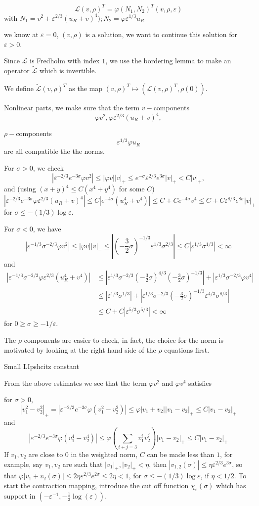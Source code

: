 \documentclass[letterpaper,11pt]{article}
\newcommand{\eps}{\varepsilon}
\numberwithin{equation}{section}
\theoremstyle{plain}
\begin{document}
\[
\mathcal{L}(v,\rho)^T = \varphi(N_1,N_2)^T(v,\rho,\eps)
\]
with $N_1 = v^2+\eps^{2/3}(u_R+v)^4); N_2 = \varphi\eps^{1/3}u_R$

we know at $\eps = 0$, $(v,\rho)$ is a solution, we want to continue this solution for $\eps>0$.

Since $\mathcal{L}$ is Fredholm with index $1$, we use the bordering lemma to make an operator $\tilde{\mathcal{L}}$ which is invertible.

We define $\tilde{\mathcal{L}}(v,\rho)^T$ as the map $(v,\rho)^T \mapsto (\mathcal{L}(v,\rho)^T,\rho(0))$.

Nonlinear parts, we make sure that 
the term 
$v-$components
\[
\varphi v^2, \varphi \eps^{2/3}(u_R+v)^4, 
\]

$\rho-$components
\[
\eps^{1/3}\varphi u_R
\]
are all compatible the the norms.

For $\sigma > 0$, we check
\[
|\eps^{-2/3}e^{-3\sigma} \varphi v^2|  \le | \varphi v||v|_+ \le e^{-\sigma} \eps^{2/3}e^{3\sigma} |v|_+ < C|v|_+ , 
\]
and (using $(x+y)^4 \le C(x^4+y^4)$ for some $C$)
\[
|\eps^{-2/3}e^{-3\sigma} \varphi \eps^{2/3}(u_R+v)^4| \le  C |e^{-4\sigma}  (u_R^4+v^4)| \le C+ Ce^{-4\sigma}v^4 \le C + C\eps^{8/3}e^{8\sigma} |v|_+
\]
for $\sigma \le - (1/3)\log \eps$. 

For $\sigma< 0$, we have
\[
|\eps^{-1/3}\sigma^{-2/3}\varphi v^2| \le |\varphi v ||v|_- \le |(-\frac{3}{2}\sigma)^{-1/3}\eps^{1/3}\sigma^{2/3}| \le C|\eps^{1/3}\sigma^{1/3}| < \infty
\]
and
\begin{align*}
|\eps^{-1/3}\sigma^{-2/3}\varphi \eps^{2/3} (u_R^4+v^4)| &\le |\eps^{1/3} \sigma ^{-2/3}(-\frac{3}{2}\sigma)^{4/3}(-\frac{3}{2}\sigma)^{-1/3}|+|\eps^{1/3}\sigma^{-2/3}\varphi v^4| \\
&\le |\eps^{1/3}\sigma^{1/3}|+|\eps^{1/3}\sigma^{-2/3}(-\frac{3}{2}\sigma)^{-1/3} \eps^{4/3}\sigma^{8/3}|\\
&\le C+ C|\eps^{5/3}\sigma^{5/3}| < \infty
\end{align*}
for $0\ge \sigma \ge -1/\eps$.

The $\rho$ components are easier to check, in fact, the choice for the norm is motivated by looking at the right hand side of the $\rho$ equations first.

Small LIpshcitz constant

From the above estimates we see that the term $\varphi v^2 $ and $\varphi v^4$ satisfies

for $\sigma > 0$,
\[
|v_1^2-v_2^2|_+= |\eps^{-2/3}e^{-3\sigma}\varphi (v_1^2-v_2^2)| \le  \varphi|v_1+v_2| |v_1-v_2|_+ \le C|v_1-v_2|_+
\]
and
\[
|\eps^{-2/3}e^{-3\sigma}\varphi (v_1^4-v_2^4)| \le  \varphi (\sum_{i+j=3} v_1^iv_2^j )|v_1-v_2|_+ \le C|v_1-v_2|_+
\]
If $v_1,v_2$ are close to $0$ in the weighted norm, $C$ can be made less than $1$, for example, say $v_1,v_2$ are such that $|v_1|_+,|v_2|_+< \eta$, then $|v_{1,2}(\sigma)| \le \eta \eps^{2/3}e^{3\sigma}$, so that $\varphi|v_1+v_2(\sigma)| \le 2\eta \eps^{2/3} e^{2\sigma} \le 2\eta <1$, for $\sigma \le -(1/3)\log \eps$, if $\eta < 1/2$.
To start the contraction mapping, introduce the cut off function $\chi_\eps(\sigma)$ which has support in $(-\eps^{-1}, -\frac{1}{3}\log(\eps))$.
\end{document}
